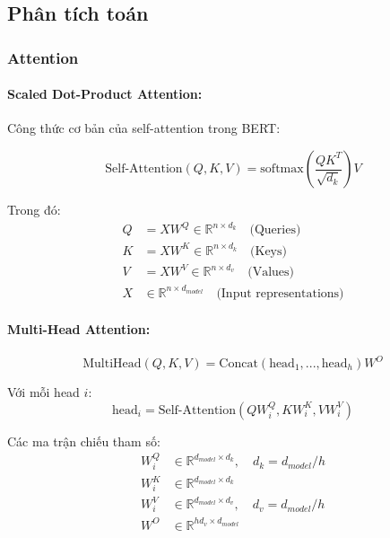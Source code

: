 \subsection{Phân tích toán}
\label{subsec:mathematical_analysis}

\subsubsection{Attention}
\label{subsubsec:attention_math}

\paragraph{Scaled Dot-Product Attention:}

Công thức cơ bản của self-attention trong BERT:

\begin{equation}
\text{Self-Attention}(Q, K, V) = \text{softmax}\left(\frac{QK^T}{\sqrt{d_k}}\right)V
\label{eq:scaled_attention}
\end{equation}

Trong đó:
\begin{align}
Q &= XW^Q \in \mathbb{R}^{n \times d_k} \quad \text{(Queries)} \\
K &= XW^K \in \mathbb{R}^{n \times d_k} \quad \text{(Keys)} \\
V &= XW^V \in \mathbb{R}^{n \times d_v} \quad \text{(Values)} \\
X &\in \mathbb{R}^{n \times d_{model}} \quad \text{(Input representations)}
\end{align}

\paragraph{Multi-Head Attention:}
\begin{equation}
\text{MultiHead}(Q, K, V) = \text{Concat}(\text{head}_1, ..., \text{head}_h)W^O
\label{eq:multihead_full}
\end{equation}

Với mỗi head $i$:
\begin{equation}
\text{head}_i = \text{Self-Attention}(QW_i^Q, KW_i^K, VW_i^V)
\label{eq:head_i_full}
\end{equation}

Các ma trận chiếu tham số:
\begin{align}
W_i^Q &\in \mathbb{R}^{d_{model} \times d_k}, \quad d_k = d_{model}/h \\
W_i^K &\in \mathbb{R}^{d_{model} \times d_k} \\
W_i^V &\in \mathbb{R}^{d_{model} \times d_v}, \quad d_v = d_{model}/h \\
W^O &\in \mathbb{R}^{hd_v \times d_{model}}
\end{align}

